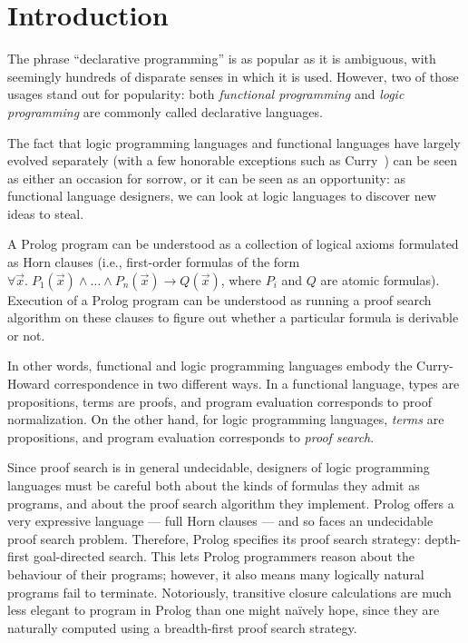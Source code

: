 \section{Introduction}

The phrase ``declarative programming'' is as popular as it is
ambiguous, with seemingly hundreds of disparate senses in which it is
used. However, two of those usages stand out for popularity: both
\emph{functional programming} and \emph{logic programming} are
commonly called declarative languages.

The fact that logic programming languages and functional languages
have largely evolved separately (with a few honorable exceptions such
as Curry~\cite{curry}) can be seen as either an occasion for sorrow,
or it can be seen as an opportunity: as functional language
designers, we can look at logic languages to discover new ideas to
steal.

A Prolog program can be understood as a collection of logical axioms
formulated as Horn clauses (i.e., first-order formulas of the form
$\forall \vec{x}.\;P_1(\vec{x}) \land \ldots \land P_n(\vec{x}) \to
Q(\vec{x})$, where $P_i$ and $Q$ are
atomic formulas).  Execution of a Prolog program can be understood as
running a proof search algorithm on these clauses to figure out
whether a particular formula is derivable or not.

In other words, functional and logic programming languages embody the
Curry-Howard correspondence in two different ways. In a functional
language, types are propositions, terms are proofs, and program
evaluation corresponds to proof normalization. On the other hand, for
logic programming languages, \emph{terms} are propositions, and
program evaluation corresponds to \emph{proof search}.

Since proof search is in general undecidable, designers of logic
programming languages must be careful both about the kinds of formulas
they admit as programs, and about the proof search algorithm they
implement. Prolog offers a very expressive language --- full Horn
clauses --- and so faces an undecidable proof search problem.
Therefore, Prolog specifies its proof search strategy: depth-first
goal-directed search. This lets Prolog programmers reason about the
behaviour of their programs; however, it also means many logically
natural programs fail to terminate. Notoriously, transitive closure
calculations are much less elegant to program in Prolog than one might
na\"ively hope, since they are naturally computed using a
breadth-first proof search strategy.

